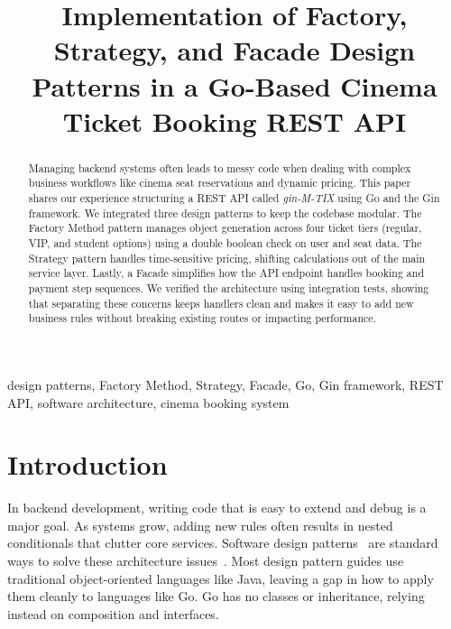 \documentclass[conference]{IEEEtran}
\begin{document}
\title{Implementation of Factory, Strategy, and Facade Design Patterns in a Go-Based Cinema Ticket Booking REST API}

\author{
}

\maketitle

\begin{abstract}
Managing backend systems often leads to messy code when dealing with complex business workflows like cinema seat reservations and dynamic pricing. This paper shares our experience structuring a REST API called \textit{gin-M-TIX} using Go and the Gin framework. We integrated three design patterns to keep the codebase modular. The Factory Method pattern manages object generation across four ticket tiers (regular, VIP, and student options) using a double boolean check on user and seat data. The Strategy pattern handles time-sensitive pricing, shifting calculations out of the main service layer. Lastly, a Facade simplifies how the API endpoint handles booking and payment step sequences. We verified the architecture using integration tests, showing that separating these concerns keeps handlers clean and makes it easy to add new business rules without breaking existing routes or impacting performance.
\end{abstract}

\begin{IEEEkeywords}
design patterns, Factory Method, Strategy, Facade, Go, Gin framework, REST API, software architecture, cinema booking system
\end{IEEEkeywords}

\section{Introduction}

In backend development, writing code that is easy to extend and debug is a major goal. As systems grow, adding new rules often results in nested conditionals that clutter core services. Software design patterns~\cite{gamma1994design} are standard ways to solve these architecture issues~\cite{alhawari2022patterns}. Most design pattern guides use traditional object-oriented languages like Java, leaving a gap in how to apply them cleanly to languages like Go. Go has no classes or inheritance, relying instead on composition and interfaces.
\end{document}
